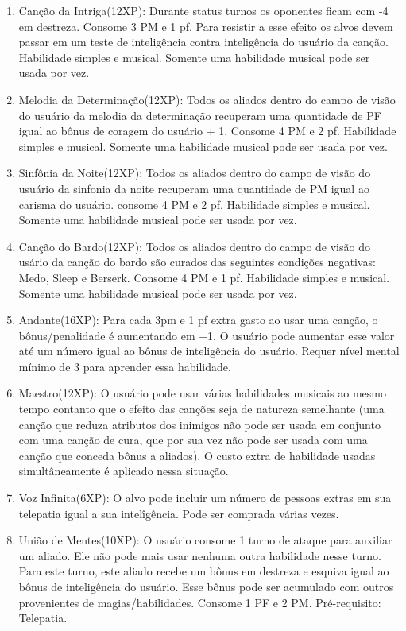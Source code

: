 \begin{enumerate}
		\item Canção da Intriga(12XP): Durante status turnos os oponentes ficam com -4 em destreza. Consome 3 PM e 1 pf. Para resistir a esse efeito os alvos devem passar em um teste de inteligência contra inteligência do usuário da canção. Habilidade simples e musical. Somente uma habilidade musical pode ser usada por vez. 
		
		\item Melodia da Determinação(12XP): Todos os aliados dentro do campo de visão do usuário da melodia da determinação recuperam uma quantidade de PF igual ao bônus de coragem do usuário + 1. Consome 4 PM e 2 pf. Habilidade simples e musical. Somente uma habilidade musical pode ser usada por vez.
		
		\item Sinfônia da Noite(12XP): Todos os aliados dentro do campo de visão do usuário da sinfonia da noite recuperam uma quantidade de PM igual ao carisma do usuário. consome 4 PM e 2 pf. Habilidade simples e musical. Somente uma habilidade musical pode ser usada por vez.
			
		\item Canção do Bardo(12XP): Todos os aliados dentro do campo de visão do usário da canção do bardo são curados das seguintes condições negativas: Medo, Sleep e Berserk. Consome 4 PM e 1 pf. Habilidade simples e musical. Somente uma habilidade musical pode ser usada por vez.	
		
		\item Andante(16XP): Para cada 3pm e 1 pf extra gasto ao usar uma canção, o bônus/penalidade é aumentando em +1. O usuário pode aumentar esse valor até um número igual ao bônus de inteligência do usuário. Requer nível mental mínimo de 3 para aprender essa habilidade.
				
		\item Maestro(12XP): O usuário pode usar várias habilidades musicais ao mesmo tempo contanto que o efeito das canções seja de natureza semelhante (uma canção que reduza atributos dos inimigos não pode ser usada em conjunto com uma canção de cura, que por sua vez não pode ser usada com uma canção que conceda bônus a aliados). O custo extra de habilidade usadas simultâneamente é aplicado nessa situação.		 
		 
		\item Voz Infinita(6XP): O alvo pode incluir um número de pessoas extras em sua telepatia igual a sua intelîgência. Pode ser comprada várias vezes.
		
		\item União de Mentes(10XP): O usuário consome 1 turno de ataque para auxiliar um aliado. Ele não pode mais usar nenhuma outra habilidade nesse turno. Para este turno, este aliado recebe um bônus em destreza e esquiva igual ao bônus de inteligência do usuário. Esse bônus pode ser acumulado com outros provenientes de magias/habilidades. Consome 1 PF e 2 PM. Pré-requisito: Telepatia.
	

\end{enumerate}
